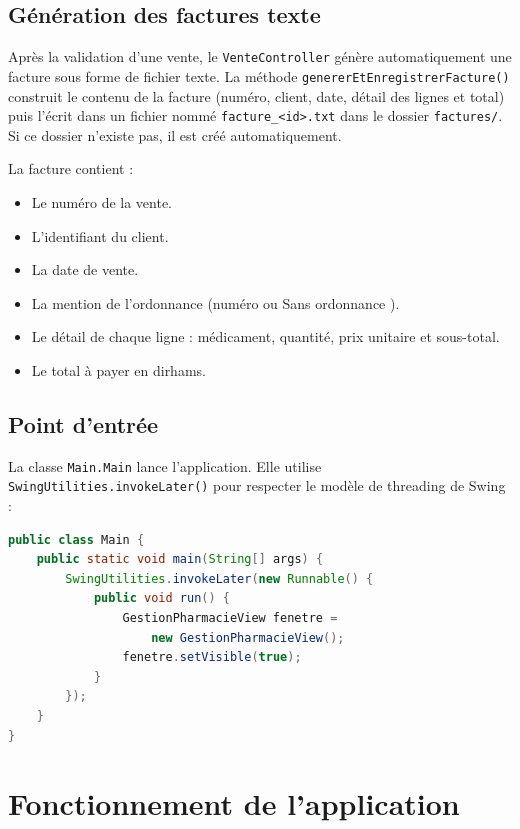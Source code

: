 \documentclass[12pt,a4paper]{report}
\begin{document}
\section{Génération des factures texte}

Après la validation d'une vente, le \texttt{VenteController} génère automatiquement une facture sous forme de fichier texte. La méthode \texttt{genererEtEnregistrerFacture()} construit le contenu de la facture (numéro, client, date, détail des lignes et total) puis l'écrit dans un fichier nommé \texttt{facture\_<id>.txt} dans le dossier \texttt{factures/}. Si ce dossier n'existe pas, il est créé automatiquement.

La facture contient :
\begin{itemize}[nosep]
  \item Le numéro de la vente.
  \item L'identifiant du client.
  \item La date de vente.
  \item La mention de l'ordonnance (numéro ou \og Sans ordonnance \fg).
  \item Le détail de chaque ligne : médicament, quantité, prix unitaire et sous-total.
  \item Le total à payer en dirhams.
\end{itemize}

\section{Point d'entrée}

La classe \texttt{Main.Main} lance l'application. Elle utilise \texttt{SwingUtilities.invokeLater()} pour respecter le modèle de threading de Swing :

\begin{lstlisting}[language=Java,caption={Classe Main}]
public class Main {
    public static void main(String[] args) {
        SwingUtilities.invokeLater(new Runnable() {
            public void run() {
                GestionPharmacieView fenetre =
                    new GestionPharmacieView();
                fenetre.setVisible(true);
            }
        });
    }
}
\end{lstlisting}

\chapter{Fonctionnement de l'application}
\end{document}

